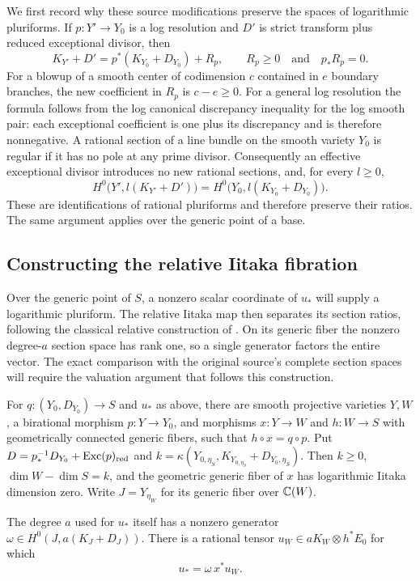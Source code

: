 We first record why these source modifications preserve the spaces of
logarithmic pluriforms.  If \(p:Y'\to Y_0\) is a log resolution and
\(D'\) is strict transform plus reduced exceptional divisor, then
\begin{equation}\label{eq:iitaka-log-discrepancy}
 K_{Y'}+D'=p^*(K_{Y_0}+D_{Y_0})+R_p,
 \qquad R_p\ge0\quad\text{and}\quad p_*R_p=0.
\end{equation}
For a blowup of a smooth center of codimension \(c\) contained in
\(e\) boundary branches, the new coefficient in \(R_p\) is \(c-e\ge0\).
For a general log resolution the formula follows from the log canonical
discrepancy inequality for the log smooth pair: each exceptional
coefficient is one plus its discrepancy and is therefore nonnegative.
A rational section of a line bundle on the smooth variety \(Y_0\) is regular if it
has no pole at any prime divisor.  Consequently an effective exceptional
divisor introduces no new rational sections, and, for every \(l\ge0\),
\begin{equation}\label{eq:iitaka-log-sections}
 H^0\bigl(Y',l(K_{Y'}+D')\bigr)
   =H^0\bigl(Y_0,l(K_{Y_0}+D_{Y_0})\bigr).
\end{equation}
These are identifications of rational pluriforms and therefore preserve
their ratios.  The same argument applies over the generic point of a
base.

\subsection{Constructing the relative Iitaka fibration}

Over the generic point of $S$, a nonzero scalar coordinate of $u_*$
will supply a logarithmic pluriform.  The relative Iitaka map then
separates its section ratios, following the classical relative
construction of \cite[\S6, Remark~1]{Iitaka1971}.  On its generic fiber
the nonzero degree-$a$ section space has rank one, so a single generator
factors the entire vector.  The exact comparison with the original
source's complete section spaces will require the valuation argument
that follows this construction.

\begin{lemma}
\label{lem:relative-iitaka-construction}
For \(q:(Y_0,D_{Y_0})\to S\) and \(u_*\) as above, there are smooth
projective varieties \(Y,W\), a birational morphism \(p:Y\to Y_0\),
and morphisms \(x:Y\to W\) and \(h:W\to S\) with geometrically
connected generic fibers, such that \(h\circ x=q\circ p\).
Put \(D=p_*^{-1}D_{Y_0}+\operatorname{Exc}(p)_{\rm red}\) and
\(k=\kappa(Y_{0,\eta_S},K_{Y_{0,\eta_S}}+D_{Y_0,\eta_S})\).
Then \(k\ge0\), \(\dim W-\dim S=k\), and the geometric generic
fiber of \(x\) has logarithmic Iitaka dimension zero.  Write
\(J=Y_{\eta_W}\) for its generic fiber over \(\mathbb C(W)\).

The degree \(a\) used for \(u_*\) itself has a nonzero generator
\(\omega\in H^0(J,a(K_J+D_J))\).  There is a rational tensor
\(u_W\in aK_W\otimes h^*E_0\) for which
\begin{equation}\label{eq:iitaka-vector-factorization}
 u_*=\omega\,x^*u_W.
\end{equation}
\end{lemma}

